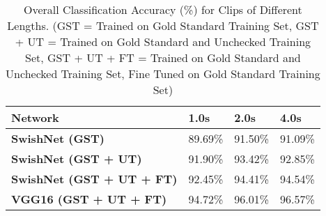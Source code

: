 \begin{table}
	\centering
	\caption{Overall Classification Accuracy (\%) for Clips of Different Lengths. (GST = Trained on Gold Standard Training Set, GST + UT = Trained on Gold Standard and Unchecked Training Set, GST + UT + FT = Trained on Gold Standard and Unchecked Training Set, Fine Tuned on Gold Standard Training Set)}
	\begin{tabular}{M{13em}P{6.5em}P{6.5em}P{6.5em}} 
		
		\toprule
		\textbf{Network} & \textbf{1.0s} & \textbf{2.0s} & \textbf{4.0s} \\
		
		\midrule
		\textbf{SwishNet (GST)} 
        & 89.69\% & 91.50\% & 91.09\% \\
		
		\midrule
		\textbf{SwishNet (GST + UT)}
	    & 91.90\% & 93.42\% & 92.85\% \\
		
		\midrule
		\textbf{SwishNet (GST + UT + FT)} 
        & 92.45\% & 94.41\% & 94.54\% \\
		
		\midrule 
		\textbf{VGG16 (GST + UT + FT)} 
        & 94.72\% & 96.01\% & 96.57\% \\
        
		\bottomrule
	\end{tabular}
	\label{tab:classperm}%
\end{table}